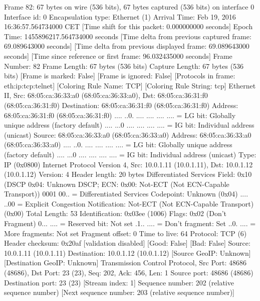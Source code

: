 Frame 82: 67 bytes on wire (536 bits), 67 bytes captured (536 bits) on interface 0
    Interface id: 0
    Encapsulation type: Ethernet (1)
    Arrival Time: Feb 19, 2016 16:36:57.564734000 CET
    [Time shift for this packet: 0.000000000 seconds]
    Epoch Time: 1455896217.564734000 seconds
    [Time delta from previous captured frame: 69.089643000 seconds]
    [Time delta from previous displayed frame: 69.089643000 seconds]
    [Time since reference or first frame: 96.032435000 seconds]
    Frame Number: 82
    Frame Length: 67 bytes (536 bits)
    Capture Length: 67 bytes (536 bits)
    [Frame is marked: False]
    [Frame is ignored: False]
    [Protocols in frame: eth:ip:tcp:telnet]
    [Coloring Rule Name: TCP]
    [Coloring Rule String: tcp]
Ethernet II, Src: 68:05:ca:36:33:a0 (68:05:ca:36:33:a0), Dst: 68:05:ca:36:31:f0 (68:05:ca:36:31:f0)
    Destination: 68:05:ca:36:31:f0 (68:05:ca:36:31:f0)
        Address: 68:05:ca:36:31:f0 (68:05:ca:36:31:f0)
        .... ..0. .... .... .... .... = LG bit: Globally unique address (factory default)
        .... ...0 .... .... .... .... = IG bit: Individual address (unicast)
    Source: 68:05:ca:36:33:a0 (68:05:ca:36:33:a0)
        Address: 68:05:ca:36:33:a0 (68:05:ca:36:33:a0)
        .... ..0. .... .... .... .... = LG bit: Globally unique address (factory default)
        .... ...0 .... .... .... .... = IG bit: Individual address (unicast)
    Type: IP (0x0800)
Internet Protocol Version 4, Src: 10.0.1.11 (10.0.1.11), Dst: 10.0.1.12 (10.0.1.12)
    Version: 4
    Header length: 20 bytes
    Differentiated Services Field: 0x10 (DSCP 0x04: Unknown DSCP; ECN: 0x00: Not-ECT (Not ECN-Capable Transport))
        0001 00.. = Differentiated Services Codepoint: Unknown (0x04)
        .... ..00 = Explicit Congestion Notification: Not-ECT (Not ECN-Capable Transport) (0x00)
    Total Length: 53
    Identification: 0x03ee (1006)
    Flags: 0x02 (Don't Fragment)
        0... .... = Reserved bit: Not set
        .1.. .... = Don't fragment: Set
        ..0. .... = More fragments: Not set
    Fragment offset: 0
    Time to live: 64
    Protocol: TCP (6)
    Header checksum: 0x20af [validation disabled]
        [Good: False]
        [Bad: False]
    Source: 10.0.1.11 (10.0.1.11)
    Destination: 10.0.1.12 (10.0.1.12)
    [Source GeoIP: Unknown]
    [Destination GeoIP: Unknown]
Transmission Control Protocol, Src Port: 48686 (48686), Dst Port: 23 (23), Seq: 202, Ack: 456, Len: 1
    Source port: 48686 (48686)
    Destination port: 23 (23)
    [Stream index: 1]
    Sequence number: 202    (relative sequence number)
    [Next sequence number: 203    (relative sequence number)]
